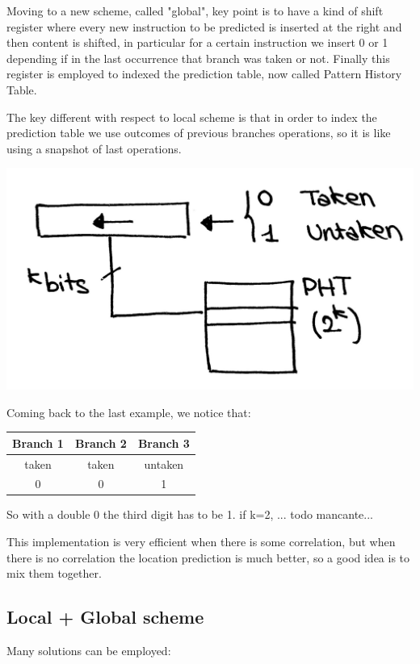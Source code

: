 Moving to a new scheme, called "global", key point is to have a kind of shift
register where every new instruction to be predicted is inserted at the right
and then content is shifted, in particular for a certain instruction we insert
0 or 1 depending if in the last occurrence that branch was taken or not. Finally
this register is employed to indexed the prediction table, now called Pattern
History Table.

The key different with respect to local scheme is that in order to index the
prediction table we use outcomes of previous branches operations, so it is like
using a snapshot of last operations.

\begin{center}
  \includegraphics[width=0.6\linewidth]{img/img3/19}
\end{center}

Coming back to the last example, we notice that:

\begin{center}
  \begin{tabular}{|c|c|c|}
    \hline
    Branch 1&   Branch 2&   Branch 3\\
    \hline
    taken&      taken&      untaken\\
    0&          0&      1\\
    \hline
  \end{tabular}
\end{center}

So with a double 0 the third digit has to be 1. if k=2, ... todo mancante...

This implementation is very efficient when there is some correlation, but when 
there is no correlation the location prediction is much better, so a good idea 
is to mix them together.


\subsection{Local + Global scheme}
Many solutions can be employed:

